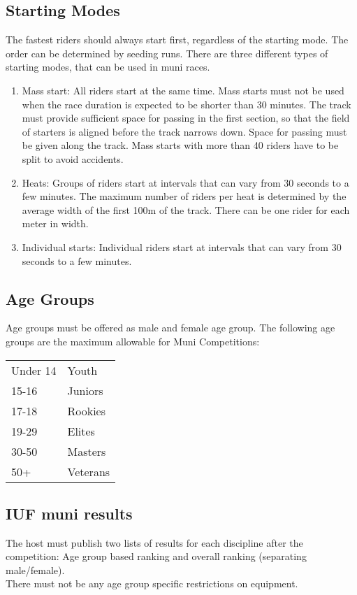 \subsection{Starting Modes}
\label{sec:muni-starting-modes}
The fastest riders should always start first, regardless of the starting mode.
The order can be determined by seeding runs. There are three different types of
starting modes, that can be used in muni races.

\begin{enumerate}
\item Mass start: All riders start at the same time. Mass starts must not be
      used when the race duration is expected to be shorter than 30 minutes. The
      track must provide sufficient space for passing in the first section, so
      that the field of starters is aligned before the track narrows down. Space
      for passing must be given along the track. Mass starts with more than 40
      riders have to be split to avoid accidents.
\item Heats: Groups of riders start at intervals that can vary from 30 seconds
      to a few minutes. The maximum number of riders per heat is determined by
      the average width of the first 100m of the track. There can be one rider
      for each meter in width.
\item Individual starts: Individual riders start at intervals that can vary from
      30 seconds to a few minutes.
\end{enumerate}

\subsection{Age Groups}
\label{sec:muni-age-groups}
Age groups must be offered as male and female age group.
The following age groups are the maximum allowable for Muni Competitions:\\
%
\begin{tabular}{ l l}
Under 14 & Youth \\
15-16 & Juniors \\
17-18 & Rookies \\
19-29 & Elites \\
30-50 & Masters \\
50+ & Veterans \\
\end{tabular}


\subsection{IUF muni results}
\label{sec:muni-results}
The host must publish two lists of results for each discipline after the
competition: Age group based ranking and overall ranking (separating
male/female).\\
There must not be any age group specific restrictions on equipment. %

